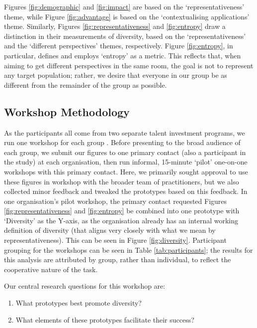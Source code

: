 Figures \ref{fig:demographic} and \ref{fig:impact} are based on the `representativeness' theme, while Figure \ref{fig:advantage} is based on the `contextualising applications' theme. Similarly, Figures \ref{fig:representativeness} and \ref{fig:entropy} draw a distinction in their measurements of diversity, based on the `representativeness' and the `different perspectives' themes, respectively. Figure \ref{fig:entropy}, in particular, defines and employs `entropy' as a metric. This reflects that, when aiming to get different perspectives in the same room, the goal is not to represent any target population; rather, we desire that everyone in our group be as different from the remainder of the group as possible.

\subsection{Workshop Methodology}\label{ssec:methods2}
As the participants all come from two separate talent investment programs, we run one workshop for each group \cite{Buchenau_Suri_2000}. Before presenting to the broad audience of each group, we submit our figures to one primary contact (also a participant in the study) at each organisation, then run informal, 15-minute `pilot' one-on-one workshops with this primary contact. Here, we primarily sought approval to use these figures in workshop with the broader team of practitioners, but we also collected minor feedback and tweaked the prototypes based on this feedback. In one organisation's pilot workshop, the primary contact requested Figures \ref{fig:representativeness} and \ref{fig:entropy} be combined into one prototype with `Diversity' as the Y-axis, as the organisation already has an internal working definition of diversity (that aligns very closely with what we mean by representativeness). This can be seen in Figure \ref{fig:diversity}. Participant grouping for the workshops can be seen in Table \ref{tab:participants}; the results for this analysis are attributed by group, rather than individual, to reflect the cooperative nature of the task.

Our central research questions for this workshop are:

\begin{enumerate}
    \item What prototypes best promote diversity?
    \item What elements of these prototypes facilitate their success?
\end{enumerate}

